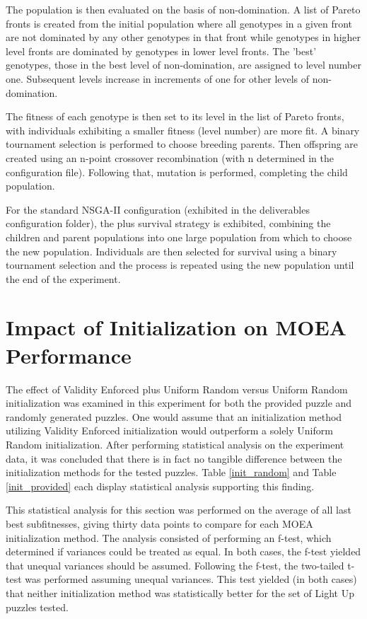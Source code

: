 \documentclass[11pt]{article}
\begin{document}
The population is then evaluated on the basis of non-domination. A list of Pareto fronts is created
from the initial population where all genotypes in a given front are not dominated
by any other genotypes in that front while genotypes in higher level fronts are dominated
by genotypes in lower level fronts. The 'best' genotypes, those in the best level
of non-domination, are assigned to level number one. Subsequent levels increase in
increments of one for other levels of non-domination.

The fitness of each genotype is then set to its level in the list of Pareto fronts, with
individuals exhibiting a smaller fitness (level number) are more fit. A binary tournament selection 
is performed to choose breeding parents. Then offspring are created using an n-point crossover
recombination (with n determined in the configuration file). Following that, mutation is performed,
completing the child population.

For the standard NSGA-II configuration (exhibited in the deliverables configuration folder),
the plus survival strategy is exhibited, combining the children and parent populations into 
one large population from which to choose the new population. Individuals are then selected for 
survival using a binary tournament selection and the process is repeated using the new population
until the end of the experiment.


\section{Impact of Initialization on MOEA Performance}

The effect of Validity Enforced plus Uniform Random versus Uniform Random initialization
was examined in this experiment for both the provided puzzle and randomly generated puzzles.
One would assume that an initialization method utilizing Validity
Enforced initialization would outperform a solely Uniform Random initialization. After performing 
statistical analysis on the experiment data, it was concluded that there is in fact no tangible difference
between the initialization methods for the tested puzzles. Table \ref{init_random} and Table \ref{init_provided} 
each display statistical analysis supporting this finding. 

This statistical analysis for this section was performed on the average of all last best subfitnesses, giving thirty
data points to compare for each MOEA initialization method. The analysis consisted of 
performing an f-test, which determined if variances could be
treated as equal. In both cases, the f-test yielded that unequal variances should be assumed. Following
 the f-test, the two-tailed t-test was performed assuming unequal variances. This test yielded
(in both cases) that neither initialization method was statistically better for the set of Light Up
puzzles tested.
\end{document}
